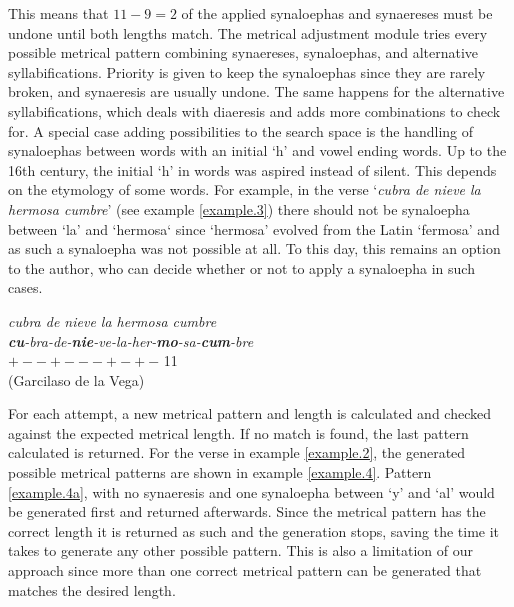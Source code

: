 \documentclass[a4paper,11pt,twocolumn,twoside]{article}
\begin{document}
This means that $11 - 9 = 2$ of the applied synaloephas and synaereses must be undone until both lengths match. The metrical adjustment module tries every possible metrical pattern combining synaereses, synaloephas, and alternative syllabifications. Priority is given to keep the synaloephas since they are rarely broken, and synaeresis are usually undone. The same happens for the alternative syllabifications, which deals with diaeresis and adds more combinations to check for. A special case adding possibilities to the search space is the handling of synaloephas between words with an initial `h' and vowel ending words.
Up to the 16th century, the initial `h' in words was aspired instead of silent. This depends on the etymology of some words. For example, in the verse `\textit{cubra de nieve la hermosa cumbre}' (see example \ref{example.3}) there should not be synaloepha between `la' and `hermosa` since `hermosa' evolved from the Latin `fermosa' and as such a synaloepha was not possible at all. To this day, this remains an option to the author, who can decide whether or not to apply a synaloepha in such cases.

\begin{subexamples}\label{example.3}
\textit{cubra de nieve la hermosa cumbre}\\
\textit{\textbf{cu}-bra-de-\textbf{nie}-ve-la-her-\textbf{mo}-sa-\textbf{cum}-bre} \\
$+--+---+-+-$ 11 \\
(Garcilaso de la Vega) \\
\end{subexamples}

For each attempt, a new metrical pattern and length is calculated and checked against the expected metrical length. If no match is found, the last pattern calculated is returned. For the verse in example \ref{example.2}, the generated possible metrical patterns are shown in example \ref{example.4}. Pattern \ref{example.4a}, with no synaeresis and one synaloepha between `y' and `al' would be generated first and returned afterwards. Since the metrical pattern has the correct length it is returned as such and the generation stops, saving the time it takes to generate any other possible pattern. This is also a limitation of our approach since more than one correct metrical pattern can be generated that matches the desired length.
\end{document}
